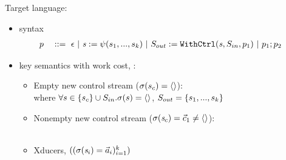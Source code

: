 \documentclass{beamer}
\begin{document}
\begin{frame}{Target language: {\fmsvcode}}
\begin{itemize}
	\item syntax 
	\begin{alignat*}{2}
	&p  && :: = \ \epsilon  \ | \ \sdef{\s}{\psi(s_1,...,s_k)} \ | \ \withctrl{\s}{p_1}{\Sin}{\Sout} \ | \ p_1;p_2  
	\end{alignat*}
	\item key semantics with work cost,  : \\[1ex]
	\begin{itemize}
		\item Empty new control stream ($\sigma(s_c) = \langle \rangle$):
		\\[2ex]
		where $\forall s \in \{s_c\} \cup S_{in}. \sigma(s) = \langle \rangle$, $S_{out} = \{s_1,...,s_k\}$ 
		
		\item Nonempty new control stream ($\sigma(\mathit{s}_c)= \vec c_1 \ne \langle \rangle$):\\[2ex]
		\\[2ex]
	
	\item  Xducers, $((\sigma(\mathit{s}_i) = \vec a_i)^k_{i=1})$ \\
	\end{itemize}		

\end{itemize}
\end{frame}
\end{document}
